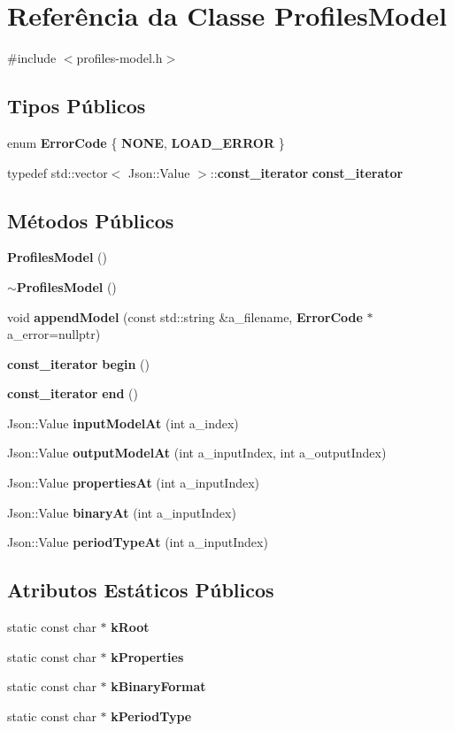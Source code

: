 \section{Referência da Classe Profiles\+Model}
\label{class_profiles_model}


{\ttfamily \#include $<$profiles-\/model.\+h$>$}

\subsection*{Tipos Públicos}
\begin{DoxyCompactItemize}
\item 
enum {\bf Error\+Code} \{ {\bf N\+O\+NE}, 
{\bf L\+O\+A\+D\+\_\+\+E\+R\+R\+OR}
 \}
\item 
typedef std\+::vector$<$ Json\+::\+Value $>$\+::{\bf const\+\_\+iterator} {\bf const\+\_\+iterator}
\end{DoxyCompactItemize}
\subsection*{Métodos Públicos}
\begin{DoxyCompactItemize}
\item 
{\bf Profiles\+Model} ()
\item 
{\bf $\sim$\+Profiles\+Model} ()
\item 
void {\bf append\+Model} (const std\+::string \&a\+\_\+filename, {\bf Error\+Code} $\ast$a\+\_\+error=nullptr)
\item 
{\bf const\+\_\+iterator} {\bf begin} ()
\item 
{\bf const\+\_\+iterator} {\bf end} ()
\item 
Json\+::\+Value {\bf input\+Model\+At} (int a\+\_\+index)
\item 
Json\+::\+Value {\bf output\+Model\+At} (int a\+\_\+input\+Index, int a\+\_\+output\+Index)
\item 
Json\+::\+Value {\bf properties\+At} (int a\+\_\+input\+Index)
\item 
Json\+::\+Value {\bf binary\+At} (int a\+\_\+input\+Index)
\item 
Json\+::\+Value {\bf period\+Type\+At} (int a\+\_\+input\+Index)
\end{DoxyCompactItemize}
\subsection*{Atributos Estáticos Públicos}
\begin{DoxyCompactItemize}
\item 
static const char $\ast$ {\bf k\+Root}
\item 
static const char $\ast$ {\bf k\+Properties}
\item 
static const char $\ast$ {\bf k\+Binary\+Format}
\item 
static const char $\ast$ {\bf k\+Period\+Type}
\end{DoxyCompactItemize}
